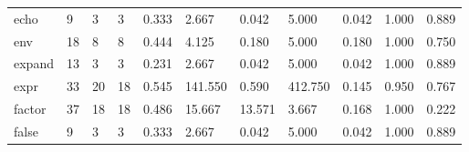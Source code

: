 \begin{longtable}{lp{1.8cm}p{1.8cm}p{1.8cm}p{1.8cm}p{1.8cm}p{1.8cm}p{1.8cm}p{1.8cm}p{1.8cm}p{1.8cm}}
echo      &                            9 &                  3 &                                 3 &                                      0.333 &                                  2.667 &                                        0.042 &                             5.000 &                                   0.042 &                              1.000 &                                              0.889 \\
env       &                           18 &                  8 &                                 8 &                                      0.444 &                                  4.125 &                                        0.180 &                             5.000 &                                   0.180 &                              1.000 &                                              0.750 \\
expand    &                           13 &                  3 &                                 3 &                                      0.231 &                                  2.667 &                                        0.042 &                             5.000 &                                   0.042 &                              1.000 &                                              0.889 \\
expr      &                           33 &                 20 &                                18 &                                      0.545 &                                141.550 &                                        0.590 &                           412.750 &                                   0.145 &                              0.950 &                                              0.767 \\
factor    &                           37 &                 18 &                                18 &                                      0.486 &                                 15.667 &                                       13.571 &                             3.667 &                                   0.168 &                              1.000 &                                              0.222 \\
false     &                            9 &                  3 &                                 3 &                                      0.333 &                                  2.667 &                                        0.042 &                             5.000 &                                   0.042 &                              1.000 &                                              0.889 \\

\end{longtable}
